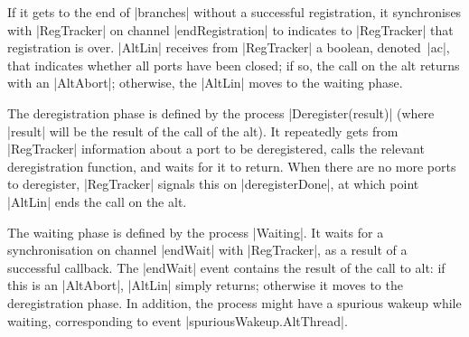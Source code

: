 If it gets to the end of |branches| without a successful registration, it
synchronises with |RegTracker| on channel |endRegistration| to indicates to
|RegTracker| that registration is over.  |AltLin| receives from |RegTracker| a
boolean, denoted~|ac|, that indicates whether all ports have been closed; if
so, the call on the alt returns with an |AltAbort|; otherwise, the |AltLin|
moves to the waiting phase.

The deregistration phase is defined by the process |Deregister(result)| (where
|result| will be the result of the call of the alt).  It repeatedly gets from
|RegTracker| information about a port to be deregistered, calls the relevant
deregistration function, and waits for it to return.  When there are no more
ports to deregister, |RegTracker| signals this on |deregisterDone|, at which
point |AltLin| ends the call on the alt. 

The waiting phase is defined by the process |Waiting|.  It waits for a
synchronisation on channel |endWait| with |RegTracker|, as a result of a
successful callback.  The |endWait| event contains the result of the call to
alt: if this is an |AltAbort|, |AltLin| simply returns; otherwise it moves to
the deregistration phase.  In addition, the process might have a spurious
wakeup while waiting, corresponding to event |spuriousWakeup.AltThread|. 


